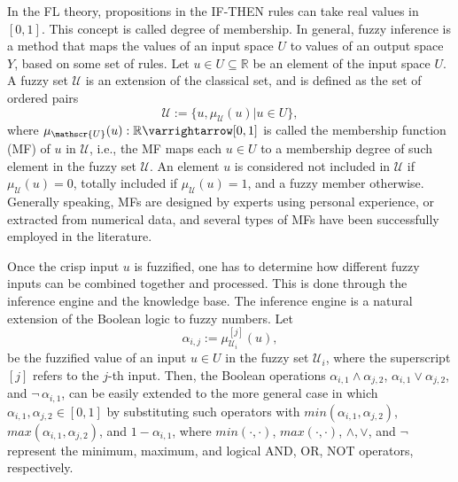 In the FL theory, propositions in the IF-THEN rules can take real values in $[0,1]$. This concept is called degree of membership. In general, fuzzy inference is a method that maps the values of an input space ${U}$ to values of an output space ${Y}$, based on some set of rules. Let $u \in {U} \subseteq \mathbb{R}$ be an element of the input space ${U}$. A fuzzy set $\mathscr{U}$ is an extension of the classical set, and is defined as the set of ordered pairs
\begin{equation}
    \mathscr{U} := \{u, \mu_{\mathscr{U}}(u) | u \in {U} \},
\end{equation}
where $ \mu_{\mathscr{U}}(u) : \mathbb{R} \varrightarrow [0, 1]$ is called the membership function (MF) of $u$ in $\mathscr{U}$, i.e., the MF maps each $u \in {U}$ to a membership degree of such element in the fuzzy set $\mathscr{U}$. An element $u$ is considered not included in $\mathscr{U}$ if $\mu_{\mathscr{U}}(u) = 0$, totally included if $\mu_{\mathscr{U}}(u) = 1$, and a fuzzy member otherwise. Generally speaking, MFs are designed by experts using personal experience, or extracted from numerical data, and several types of MFs have been successfully employed in the literature.


Once the crisp input $u$ is fuzzified, one has to determine how different fuzzy inputs can be combined together and processed. This is done through the inference engine and the knowledge base.
The inference engine is a natural extension of the Boolean logic to fuzzy numbers. Let 
$$\alpha_{i,j} :=\mu^{[j]}_{\mathscr{U}_{i}}\left(u\right),$$ 
be the fuzzified value of an input $u \in {U}$ in the fuzzy set $\mathscr{U}_i$, where the superscript $[j]$ refers to the $j$-th input.
Then, the Boolean operations $\alpha_{i,1} \wedge \alpha_{j,2}$, $\alpha_{i,1} \vee \alpha_{j,2}$, and $\neg \, \alpha_{i,1}$, can be easily extended to the more general case in which $\alpha_{i,1}, \alpha_{j,2} \in [0,1]$ by substituting such operators with $min(\alpha_{i,1}, \alpha_{j,2})$, $max(\alpha_{i,1}, \alpha_{j,2})$, and $1-\alpha_{i,1}$, where $min(\cdot, \cdot)$, $max(\cdot, \cdot)$, $\wedge, \vee$, and $\neg$ represent the minimum, maximum, and logical AND, OR, NOT operators, respectively. 
%
%

